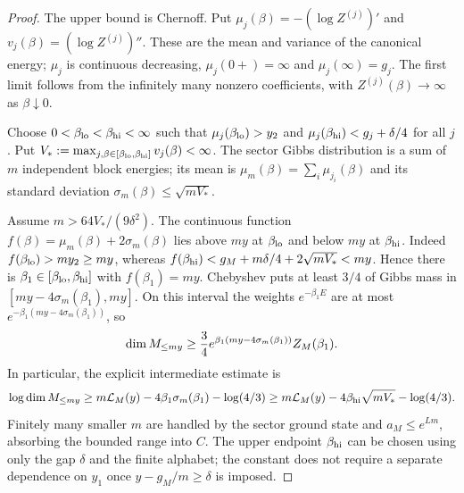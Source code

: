 \documentclass[10pt,a4paper]{article}
\numberwithin{equation}{section}
\theoremstyle{remark}\newtheorem{remark}[theorem]{Remark}\newtheorem{question}[theorem]{Question}
\begin{document}
\begin{proof}
The upper bound is Chernoff. Put $\mu_j(\beta)=-(\log Z^{(j)})'$ and $v_j(\beta)=(\log Z^{(j)})''$. These are the mean and variance of the canonical energy; $\mu_j$ is continuous decreasing, $\mu_j(0+)=\infty$ and $\mu_j(\infty)=g_j$. The first limit follows from the infinitely many nonzero coefficients, with $Z^{(j)}(\beta)\to\infty$ as $\beta\downarrow0$.

Choose $0<\beta_{\rm lo}<\beta_{\rm hi}<\infty$ such that $\mu_j(\beta_{\rm lo})>y_2$ and $\mu_j(\beta_{\rm hi})<g_j+\delta/4$ for all $j$. Put $V_*:=\max_{j,\beta\in[\beta_{\rm lo},\beta_{\rm hi}]}v_j(\beta)<\infty$. The sector Gibbs distribution is a sum of $m$ independent block energies; its mean is $\mu_m(\beta)=\sum_i\mu_{j_i}(\beta)$ and its standard deviation $\sigma_m(\beta)\le\sqrt{mV_*}$.

Assume $m>64V_*/(9\delta^2)$. The continuous function $f(\beta)=\mu_m(\beta)+2\sigma_m(\beta)$ lies above $my$ at $\beta_{\rm lo}$ and below $my$ at $\beta_{\rm hi}$. Indeed $f(\beta_{\rm lo})>my_2\ge my$, whereas $f(\beta_{\rm hi})<g_M+m\delta/4+2\sqrt{mV_*}<my$. Hence there is $\beta_1\in[\beta_{\rm lo},\beta_{\rm hi}]$ with $f(\beta_1)=my$. Chebyshev puts at least $3/4$ of Gibbs mass in $[my-4\sigma_m(\beta_1),my]$. On this interval the weights $e^{-\beta_1 E}$ are at most $e^{-\beta_1(my-4\sigma_m(\beta_1))}$, so
\[
\operatorname{dim} M_{\le my}\ge \frac34e^{\beta_1(my-4\sigma_m(\beta_1))}Z_M(\beta_1).
\]
In particular, the explicit intermediate estimate is
\begin{equation}\label{eq:cheb-explicit}
\log\operatorname{dim} M_{\le my}\ge m\mathcal L_M(y)-4\beta_1\sigma_m(\beta_1)-\log(4/3)
\ge m\mathcal L_M(y)-4\beta_{\rm hi}\sqrt{mV_*}-\log(4/3).
\end{equation}
Finitely many smaller $m$ are handled by the sector ground state and $a_M\le e^{Lm}$, absorbing the bounded range into $C$. The upper endpoint $\beta_{\rm hi}$ can be chosen using only the gap $\delta$ and the finite alphabet; the constant does not require a separate dependence on $y_1$ once $y-g_M/m\ge\delta$ is imposed.
\end{proof}
\end{document}

